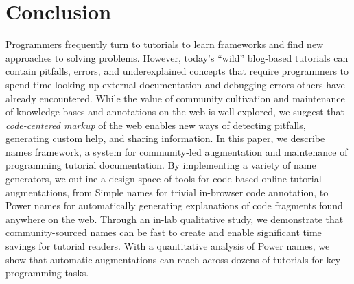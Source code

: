 \section{Conclusion}

Programmers frequently turn to tutorials to learn frameworks and find new approaches to solving problems.
However, today's ``wild'' blog-based tutorials can contain pitfalls, errors, and underexplained concepts that require programmers to spend time looking up external documentation and debugging errors others have already encountered.
While the value of community cultivation and maintenance of knowledge bases and annotations on the web is well-explored, we suggest that \emph{code-centered markup} of the web enables new ways of detecting pitfalls, generating custom help, and sharing information.
In this paper, we describe \Glspl{name} framework, a system for community-led augmentation and maintenance of programming tutorial documentation.
By implementing a variety of \Gls{name} generators, we outline a design space of tools for code-based online tutorial augmentations, from Simple \Glspl{name} for trivial in-browser code annotation, to Power \Glspl{name} for automatically generating explanations of code fragments found anywhere on the web.
Through an in-lab qualitative study, we demonstrate that community-sourced \Glspl{name} can be fast to create and enable significant time savings for tutorial readers.
With a quantitative analysis of Power \Glspl{name}, we show that automatic augmentations can reach across dozens of tutorials for key programming tasks.
